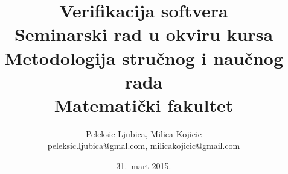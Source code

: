 \documentclass[a4paper]{article}
\begin{document}
\title{Verifikacija softvera\\ \small{Seminarski rad u okviru kursa\\Metodologija stručnog i naučnog rada\\ Matematički fakultet}}

\author{Peleksic Ljubica, Milica Kojicic \\ peleksic.ljubica@gmal.com, milicakojicic@gmail.com}
\date{31.~mart 2015.}
\maketitle

\end{document}
